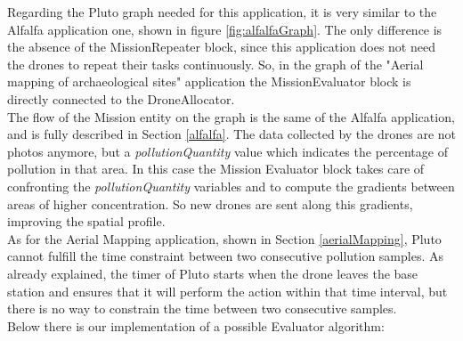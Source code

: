 Regarding the Pluto graph needed for this application, it is very similar to the Alfalfa\cite{alfalfa} application one, shown in figure \ref{fig:alfalfaGraph}.
The only difference is the absence of the MissionRepeater block, since this application does not need the drones to repeat their tasks continuously.
So, in the graph of the "Aerial mapping of archaeological sites" application the MissionEvaluator block is directly connected to the DroneAllocator.
\\

The flow of the Mission entity on the graph is the same of the Alfalfa\cite{alfalfa} application, and is fully described in Section \ref{alfalfa}.
The data collected by the drones are not photos anymore, but a \textit{pollutionQuantity} value which indicates the percentage of pollution in that area.
In this case the Mission Evaluator block takes care of confronting the \textit{pollutionQuantity} variables and to compute the gradients between areas of higher concentration.
So new drones are sent along this gradients, improving the spatial profile.
\\


As for the Aerial Mapping application, shown in Section \ref{aerialMapping}, Pluto cannot fulfill the time constraint between two consecutive pollution samples.
As already explained, the timer of Pluto starts when the drone leaves the base station and ensures that it will perform the action within that time interval, but there is no way to constrain the time between two consecutive samples.
\\


Below there is our implementation of a possible Evaluator algorithm:
\\


